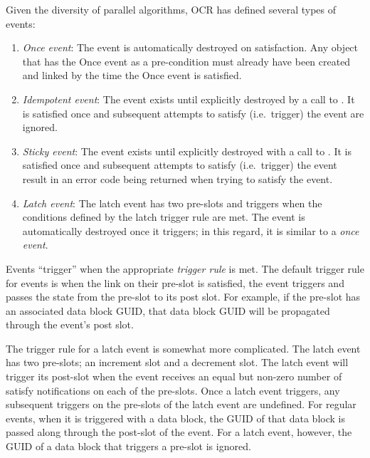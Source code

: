 Given the diversity of parallel algorithms, OCR has defined several
types of events:
\begin{enumerate}
\item \emph{Once event}: The event is automatically
destroyed on satisfaction. Any object that has the Once event as a
pre-condition must already have been created and linked by the time
the Once event is satisfied.

\item \emph{Idempotent event}: The event
exists until explicitly destroyed by a call to
. It is satisfied once and subsequent attempts
to satisfy (i.e.\ trigger) the event are ignored.

\item \emph{Sticky event}: The event exists until
explicitly destroyed with a call to . It is
satisfied once and subsequent attempts to satisfy (i.e.\ trigger) the
event result in an error code being returned when trying to satisfy
the event.
%
%
%
\item \emph{Latch event}: The latch event has two
pre-slots and triggers when the conditions defined by the latch
trigger rule are met. The event is automatically destroyed once it
triggers; in this regard, it is similar to a \emph{once event}.
\end{enumerate}

Events ``trigger'' when the appropriate \emph{trigger
rule} is met. The default trigger rule for events
is when the link on their pre-slot is satisfied, the event triggers
and passes the state from the pre-slot to its post slot. For example,
if the pre-slot has an associated data block GUID, that data block
GUID will be propagated through the event's post slot.

The trigger rule for a latch event is somewhat more complicated. The
latch event has two pre-slots; an increment slot and a decrement
slot. The latch event will trigger its post-slot when the event
receives an equal but non-zero number of satisfy notifications on each
of the pre-slots. Once a latch event triggers, any subsequent
triggers on the pre-slots of the latch event are undefined. For
regular events, when it is triggered with a data block, the GUID of
that data block is passed along through the post-slot of the
event. For a latch event, however, the GUID of a data block that
triggers a pre-slot is ignored.

